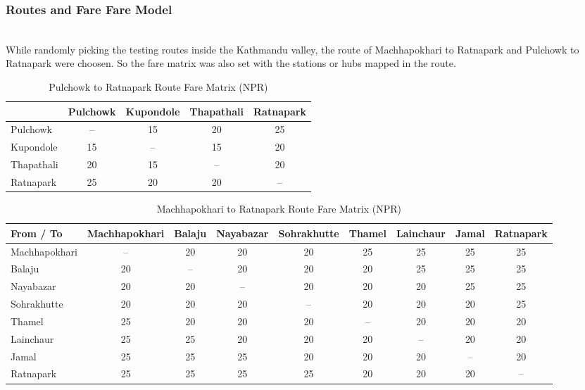 \documentclass[manuscript,review,anonymous]{acmart}
\begin{document}
\subsubsection{Routes and Fare Fare Model} \mbox{} \\

While randomly picking the testing routes inside the Kathmandu valley, the route of Machhapokhari to Ratnapark and Pulchowk to Ratnapark were choosen. So the fare matrix was also set with the stations or hubs mapped in the route.

\begin{table}[H]
\centering
\caption{Pulchowk to Ratnapark Route Fare Matrix (NPR)}
\label{tab:pulchowk_fare_matrix}
\begin{tabular}{lcccc}
\toprule
\textbf{} & \textbf{Pulchowk} & \textbf{Kupondole} & \textbf{Thapathali} & \textbf{Ratnapark} \\
\midrule
Pulchowk   & -- & 15 & 20 & 25 \\
Kupondole  & 15 & -- & 15 & 20 \\
Thapathali & 20 & 15 & -- & 20 \\
Ratnapark  & 25 & 20 & 20 & -- \\
\bottomrule
\end{tabular}
\end{table}

\begin{table}[t]
\centering
\caption{Machhapokhari to Ratnapark Route Fare Matrix (NPR)}
\label{tab:fare_matrix}
\begin{tabular}{lcccccccc}
\toprule
\textbf{From / To} & \textbf{Machhapokhari} & \textbf{Balaju} & \textbf{Nayabazar} & \textbf{Sohrakhutte} & \textbf{Thamel} & \textbf{Lainchaur} & \textbf{Jamal} & \textbf{Ratnapark} \\
\midrule
Machhapokhari & -- & 20 & 20 & 20 & 25 & 25 & 25 & 25 \\
Balaju        & 20 & -- & 20 & 20 & 20 & 25 & 25 & 25 \\
Nayabazar     & 20 & 20 & -- & 20 & 20 & 20 & 25 & 25 \\
Sohrakhutte   & 20 & 20 & 20 & -- & 20 & 20 & 20 & 25 \\
Thamel        & 25 & 20 & 20 & 20 & -- & 20 & 20 & 20 \\
Lainchaur     & 25 & 25 & 20 & 20 & 20 & -- & 20 & 20 \\
Jamal         & 25 & 25 & 25 & 20 & 20 & 20 & -- & 20 \\
Ratnapark     & 25 & 25 & 25 & 25 & 20 & 20 & 20 & -- \\
\bottomrule
\end{tabular}
\end{table}
\end{document}
